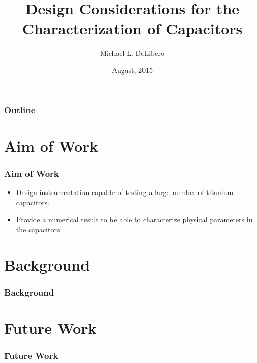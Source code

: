 \documentclass{beamer}
\title{Design Considerations for the Characterization of Capacitors}
\author{Michael L. DeLibero}
\date{August, 2015}
\institute[CWRU]{Case Western Reserve University}
\begin{document}
\begin{frame}
    \titlepage
\end{frame}

\begin{frame}
  \frametitle{Outline}
  \tableofcontents
\end{frame}

\section{Aim of Work}
\begin{frame}
    \frametitle{Aim of Work}
    \begin{itemize}
        \item Design instrumentation capable of testing a large number of titanium capacitors.
        \item Provide a numerical result to be able to characterize physical parameters in the capacitors.
    \end{itemize}
\end{frame}

\section{Background}
\begin{frame}
    \frametitle{Background}
\end{frame}




\section{Future Work}
\begin{frame}
    \frametitle{Future Work}
    
\end{frame}


\end{document}
